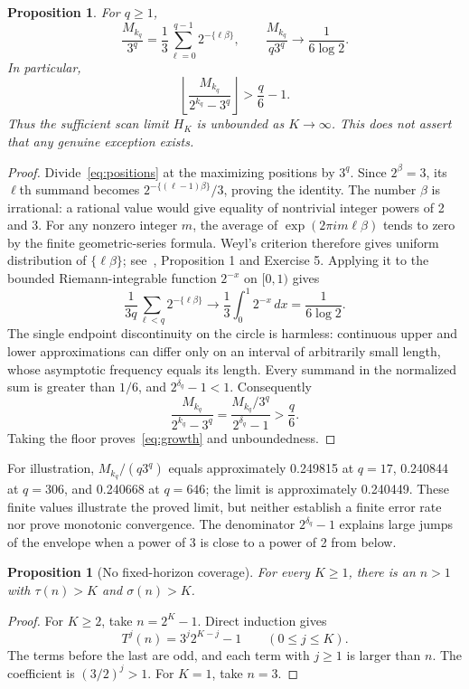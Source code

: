 \documentclass[11pt,a4paper]{amsart}
\newtheorem{proposition}[theorem]{Proposition}
\theoremstyle{definition}
\theoremstyle{remark}
\begin{document}
\begin{proposition}\label{prop:asymptotic}
For $q\ge1$,
\begin{equation}\label{eq:normalized}
\frac{M_{k_q}}{3^q}
=\frac13\sum_{\ell=0}^{q-1}2^{-\{\ell\beta\}},\qquad
\frac{M_{k_q}}{q3^q}\longrightarrow\frac1{6\log2}.
\end{equation}
In particular,
\begin{equation}\label{eq:growth}
\left\lfloor\frac{M_{k_q}}{2^{k_q}-3^q}\right\rfloor
>\frac q6-1.
\end{equation}
Thus the sufficient scan limit $H_K$ is unbounded as $K\to\infty$.
This does not assert that any genuine exception exists.
\end{proposition}
\begin{proof}
Divide~\eqref{eq:positions} at the maximizing positions by $3^q$.
Since $2^\beta=3$, its $\ell$th summand becomes
$2^{-\{(\ell-1)\beta\}}/3$, proving the identity.
The number $\beta$ is irrational: a rational value would give equality
of nontrivial integer powers of 2 and 3.
For any nonzero integer $m$, the average of
$\exp(2\pi i m\ell\beta)$ tends to zero by the finite geometric-series
formula. Weyl's criterion therefore gives uniform distribution of
$\{\ell\beta\}$; see~\cite{TaoNotes}, Proposition 1 and Exercise 5.
Applying it to the bounded Riemann-integrable function $2^{-x}$ on
$[0,1)$ gives
\[
\frac1{3q}\sum_{\ell<q}2^{-\{\ell\beta\}}
\longrightarrow\frac13\int_0^1 2^{-x}\,dx=\frac1{6\log2}.
\]
The single endpoint discontinuity on the circle is harmless: continuous
upper and lower approximations can differ only on an interval of
arbitrarily small length, whose asymptotic frequency equals its length.
Every summand in the normalized sum is greater than $1/6$, and
$2^{\delta_q}-1<1$. Consequently
\[
\frac{M_{k_q}}{2^{k_q}-3^q}
=\frac{M_{k_q}/3^q}{2^{\delta_q}-1}>\frac q6.
\]
Taking the floor proves~\eqref{eq:growth} and unboundedness.
\end{proof}

For illustration, $M_{k_q}/(q3^q)$ equals approximately 0.249815 at
$q=17$, 0.240844 at $q=306$, and 0.240668 at $q=646$; the limit is
approximately 0.240449. These finite values illustrate the proved limit,
but neither establish a finite error rate nor prove monotonic convergence.
The denominator $2^{\delta_q}-1$ explains large jumps of the envelope
when a power of 3 is close to a power of 2 from below.

\begin{proposition}[No fixed-horizon coverage]\label{prop:obstruction}
For every $K\ge1$, there is an $n>1$ with $\tau(n)>K$ and $\sigma(n)>K$.
\end{proposition}
\begin{proof}
For $K\ge2$, take $n=2^K-1$. Direct induction gives
\[
T^j(n)=3^j2^{K-j}-1\qquad(0\le j\le K).
\]
The terms before the last are odd, and each term with $j\ge1$ is larger
than $n$. The coefficient is $(3/2)^j>1$. For $K=1$, take $n=3$.
\end{proof}
\end{document}
